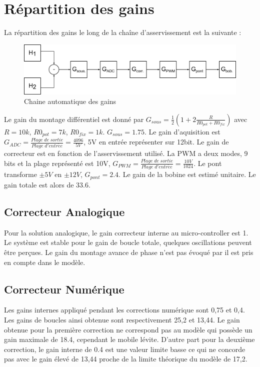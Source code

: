 \documentclass[11pt, french]{article} %
\begin{document}
\section{Répartition des gains}
La répartition des gains le long de la chaîne d'asservissement est la suivante :
\begin{figure}[h!]
	\centering
	\includegraphics[width = 16cm]{SolutionNumerique/Gain.png} 
	\caption{Chaine automatique des gains}
\end{figure}

Le gain du montage différentiel est donné par $G_{sous}=\frac{1}{2}\left( 1+2 \frac{R}{R0_{pot}+R0_{fix}}\right)$ avec $R=10k$, $R0_{pot}=7k$, $R0_{fix}=1k$. $G_{sous}=1.75$.
Le gain d'aquisition est $G_{ADC}= \frac{Plage \; de \; sortie}{Plage \; d'entr \acute{e} e}=\frac{4096}{5V}$, 5V en entrée représenter sur 12bit. 
Le gain de correcteur est en fonction de l'asservissement utilisé.
La PWM a deux modes, 9 bits et la plage représenté est 10V, $G_{PWM}= \frac{Plage \; de \; sortie}{Plage \; d'entr \acute{e} e}=\frac{10V}{1024}$.
Le pont transforme $\pm5V$ en $\pm12V$, $G_{pont}=2.4$.
Le gain de la bobine est estimé unitaire. Le gain totale est alors de $33.6$.

\subsection{Correcteur Analogique}
Pour la solution analogique, le gain correcteur interne au micro-controller est 1. Le système est stable pour le gain de boucle totale, quelques oscillations peuvent être perçues. Le gain du montage avance de phase n'est pas évoqué par il est pris en compte dans le modèle.
\subsection{Correcteur Numérique}
Les gains internes appliqué pendant les corrections numérique sont 0,75 et 0,4. Les gains de boucles ainsi obtenue sont respectivement 25,2 et 13,44. Le gain obtenue pour la première correction ne correspond pas au modèle qui possède un gain maximale de 18.4, cependant le mobile lévite. D'autre part pour la deuxième correction, le gain interne de 0.4 est une valeur limite basse ce qui ne concorde pas avec le gain élevé de 13,44 proche de la limite théorique du modèle de 17,2.
\end{document}
